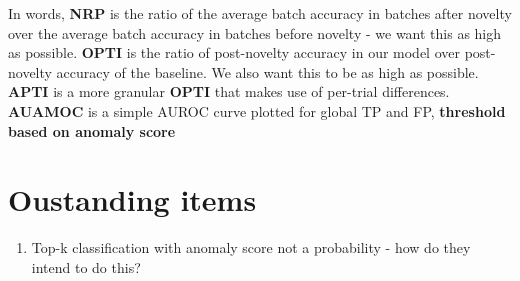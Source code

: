\documentclass[11pt]{article}
\begin{document}
In words, \textbf{NRP} is the ratio of the average batch accuracy in batches after novelty over the average batch accuracy in batches before novelty - we want this as high as possible. \textbf{OPTI} is the ratio of post-novelty accuracy in our model over post-novelty accuracy of the baseline. We also want this to be as high as possible. \textbf{APTI} is a more granular \textbf{OPTI} that makes use of per-trial differences. \textbf{AUAMOC} is a simple AUROC curve plotted for global TP and FP, \textbf{threshold based on anomaly score} 


\section{Oustanding items}%
\label{sec:oustanding_items}

\begin{enumerate}
  \item Top-k classification with anomaly score not a probability - how do they intend to do this?
\end{enumerate}
\end{document}
